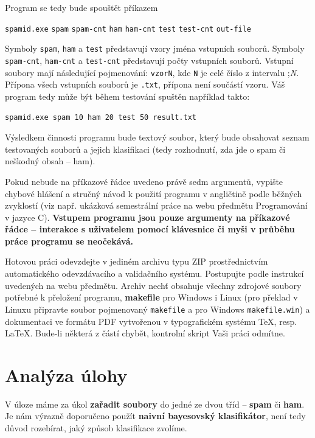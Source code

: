 \documentclass[12pt]{report}
\newcommand\la{\textlangle}  					%
\newcommand\ra{\textrangle}						%
\newcommand\laratexttt[1]{\la\texttt{#1}\ra}	%
\newcommand\indentt[1]{						
	\setlength\parindent{5mm}
	#1
	\setlength\parindent{0mm}
	}											%
\begin{document}
	Program se tedy bude spouštět příkazem
	
	\indentt{\texttt{spamid.exe} \laratexttt{spam} \laratexttt{spam-cnt} \laratexttt{ham} \laratexttt{ham-cnt} \laratexttt{test} \laratexttt{test-cnt} \laratexttt{out-file}$\,$\keys{\return}}
	
	Symboly \laratexttt{spam}, \laratexttt{ham} a \laratexttt{test} představují vzory jména vstupních souborů. Symboly \laratexttt{spam-cnt}, \laratexttt{ham-cnt} a \laratexttt{test-cnt} představují počty vstupních souborů. Vstupní soubory mají následující pojmenování: \texttt{vzorN}, kde \texttt{N} je celé číslo z intervalu \la1;\textit{N}\ra. Přípona všech vstupních souborů je \texttt{.txt}, přípona není součástí vzoru. Váš program tedy může být během testování spuštěn například takto:
	
	\indentt{
	\texttt{spamid.exe spam 10 ham 20 test 50 result.txt}$\,$\keys{\return}
	}
	
	Výsledkem činnosti programu bude textový soubor, který bude obsahovat seznam testovaných souborů a jejich klasifikaci (tedy rozhodnutí, zda jde o spam či neškodný obsah – ham).
	
	Pokud nebude na příkazové řádce uvedeno právě sedm argumentů, vypište chybové hlášení a stručný návod k použití programu v angličtině podle běžných zvyklostí (viz např. ukázková semestrální práce na webu předmětu Programování v jazyce C). \textbf{Vstupem programu jsou pouze argumenty na příkazové řádce – interakce s uživatelem pomocí klávesnice či myši v průběhu práce programu se neočekává.}
	
	Hotovou práci odevzdejte v jediném archivu typu ZIP prostřednictvím automatického odevzdávacího a validačního systému. Postupujte podle instrukcí uvedených na webu předmětu. Archiv nechť obsahuje všechny zdrojové soubory potřebné k přeložení programu, \textbf{makefile} pro Windows i Linux (pro překlad v Linuxu připravte soubor pojmenovaný \texttt{makefile} a pro Windows \texttt{makefile.win}) a dokumentaci ve formátu PDF vytvořenou v typografickém systému \TeX, resp. \LaTeX. Bude-li některá z částí chybět, kontrolní skript Vaši práci odmítne.

	\chapter{Analýza úlohy}
	V úloze máme za úkol \textbf{zařadit soubory} do jedné ze dvou tříd – \textbf{spam} či \textbf{ham}. Je nám výrazně doporučeno použít \textbf{naivní bayesovský klasifikátor}, není tedy důvod rozebírat, jaký způsob klasifikace zvolíme.
	
\end{document}
